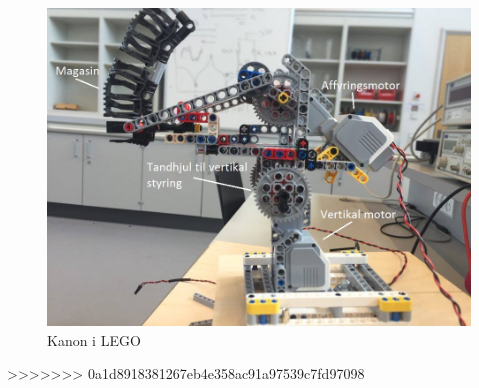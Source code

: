 \begin{figure}[H]
	\centering
	\includegraphics[width=1\textwidth]{Afsnit/DesignOgImplementering/images/kanon}
	\caption{Kanon i LEGO}
	\label{fig:kanon}
\end{figure}










>>>>>>> 0a1d8918381267eb4e358ac91a97539c7fd97098
